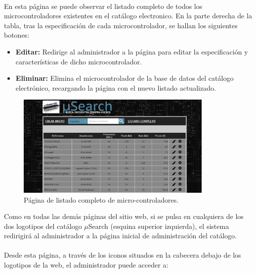 \paragraph{}En esta página se puede observar el listado completo de todos los microcontroladores existentes en el catálogo electronico. En la parte derecha de la tabla, tras la especificación de cada microcontrolador, se hallan los siguientes botones:
\begin{itemize}
	\item \textbf{Editar:} Redirige al administrador a la página para editar la especificación y características de dicho microcontrolador.
	\item \textbf{Eliminar:} Elimina el microcontrolador de la base de datos del catálogo electrónico, recargando la página con el nuevo listado actualizado.
\end{itemize}

\begin{figure}[h!]
	\centering
	\includegraphics[width=0.85\textwidth]{img/listado_completo_admin}
	\caption{Página de listado completo de micro-controladores.}
	\label{fig:listado_completo_admin}
\end{figure}

Como en todas las demás páginas del sitio web, si se pulsa en cualquiera de los dos logotipos del catálogo $\mu$Search (esquina superior izquierda), el sistema redirigirá al administrador a la página inicial de administración del catálogo.

\paragraph{}Desde esta página, a través de los iconos situados en la cabecera debajo de los logotipos de la web, el administrador puede acceder a:

